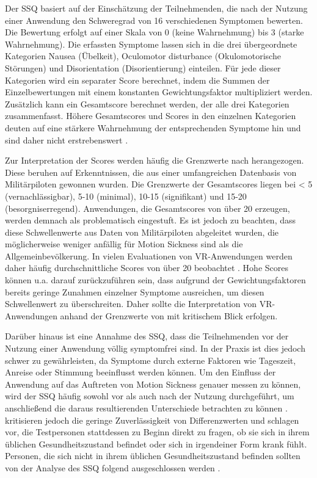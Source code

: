 Der SSQ basiert auf der Einschätzung der Teilnehmenden, die nach der Nutzung einer Anwendung den Schweregrad von 16 verschiedenen Symptomen bewerten. Die Bewertung erfolgt auf einer Skala von 0 (keine Wahrnehmung) bis 3 (starke Wahrnehmung). Die erfassten Symptome lassen sich in die drei übergeordnete Kategorien Nausea (Übelkeit), Oculomotor disturbance (Okulomotorische Störungen) und Disorientation (Disorientierung) einteilen. Für jede dieser Kategorien wird ein separater Score berechnet, indem die Summen der Einzelbewertungen mit einem konstanten Gewichtungsfaktor multipliziert werden. 
Zusätzlich kann ein Gesamtscore berechnet werden, der alle drei Kategorien zusammenfasst. Höhere Gesamtscores und Scores in den einzelnen Kategorien deuten auf eine stärkere Wahrnehmung der entsprechenden Symptome hin und sind daher nicht erstrebenswert \citep{kennedy_simulator_1993}.

Zur Interpretation der Scores werden häufig die Grenzwerte nach \citet{stanney_cybersickness_1997} herangezogen. Diese beruhen auf Erkenntnissen, die aus einer umfangreichen Datenbasis von Militärpiloten gewonnen wurden. Die Grenzwerte der Gesamtscores liegen bei < 5 (vernachlässigbar), 5-10 (minimal), 10-15 (signifikant) und 15-20 (besorgniserregend). Anwendungen, die Gesamtscores von über 20 erzeugen, werden demnach als problematisch eingestuft. Es ist jedoch zu beachten, dass diese Schwellenwerte aus Daten von Militärpiloten abgeleitet wurden, die möglicherweise weniger anfällig für Motion Sickness sind als die Allgemeinbevölkerung. In vielen Evaluationen von VR-Anwendungen werden daher häufig durchschnittliche Scores von über 20 beobachtet \citep{bimberg_usage_2020}. Hohe Scores können u.a. darauf zurückzuführen sein, dass aufgrund der Gewichtungsfaktoren bereits geringe Zunahmen einzelner Symptome ausreichen, um diesen Schwellenwert zu überschreiten. Daher sollte die Interpretation von VR-Anwendungen anhand der Grenzwerte von \citet{stanney_cybersickness_1997} mit kritischem Blick erfolgen. 

Darüber hinaus ist eine Annahme des SSQ, dass die Teilnehmenden vor der Nutzung einer Anwendung völlig symptomfrei sind. In der Praxis ist dies jedoch schwer zu gewährleisten, da Symptome durch externe Faktoren wie Tageszeit, Anreise oder Stimmung beeinflusst werden können. Um den Einfluss der Anwendung auf das Auftreten von Motion Sickness genauer messen zu können, wird der SSQ häufig sowohl vor als auch nach der Nutzung durchgeführt, um anschließend die daraus resultierenden Unterschiede betrachten zu können \citep{bimberg_usage_2020}. \citet{kennedy_simulator_1993} kritisieren jedoch die geringe Zuverlässigkeit von Differenzwerten und schlagen vor, die Testpersonen stattdessen zu Beginn direkt zu fragen, ob sie sich in ihrem üblichen Gesundheitszustand befindet oder sich in irgendeiner Form krank fühlt. Personen, die sich nicht in ihrem üblichen Gesundheitszustand befinden sollten von der Analyse des SSQ folgend ausgeschlossen werden \citep{jerald_vr_2016}.

